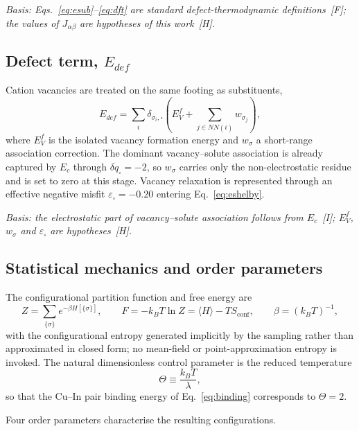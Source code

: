 \documentclass[11pt,a4paper]{article}
\begin{document}
\textit{Basis: Eqs.~\eqref{eq:esub}--\eqref{eq:dft} are standard
defect-thermodynamic definitions~[F]; the values of $J_{\alpha\beta}$ are
hypotheses of this work~[H].}

\subsection{Defect term, \texorpdfstring{$E_{def}$}{Edef}}

Cation vacancies are treated on the same footing as substituents,
\begin{equation}
E_{def} = \sum_i \delta_{\sigma_i, \square}
\left( E^{f}_{V} + \sum_{j \in NN(i)} w_{\sigma_j} \right),
\end{equation}
where $E^f_V$ is the isolated vacancy formation energy and $w_{\sigma}$ a
short-range association correction. The dominant vacancy--solute association is
already captured by $E_c$ through $\delta q_\square = -2$, so $w_\sigma$ carries
only the non-electrostatic residue and is set to zero at this stage. Vacancy
relaxation is represented through an effective negative misfit
$\varepsilon_\square = -0.20$ entering Eq.~\eqref{eq:eshelby}.

\textit{Basis: the electrostatic part of vacancy--solute association follows from
$E_c$~[I]; $E^f_V$, $w_\sigma$ and $\varepsilon_\square$ are hypotheses~[H].}

\subsection{Statistical mechanics and order parameters}
\label{sec:orderparams}

The configurational partition function and free energy are
\begin{equation}
Z = \sum_{\{\sigma\}} e^{-\beta H[\{\sigma\}]}, \qquad
F = -k_B T \ln Z = \langle H \rangle - T S_{\mathrm{conf}},
\qquad \beta = (k_B T)^{-1},
\end{equation}
with the configurational entropy generated implicitly by the sampling rather
than approximated in closed form; no mean-field or point-approximation entropy
is invoked. The natural dimensionless control parameter is the reduced
temperature
\begin{equation}
\Theta \equiv \frac{k_B T}{\lambda},
\label{eq:theta}
\end{equation}
so that the Cu--In pair binding energy of Eq.~\eqref{eq:binding} corresponds to
$\Theta = 2$.

Four order parameters characterise the resulting configurations.
\end{document}
